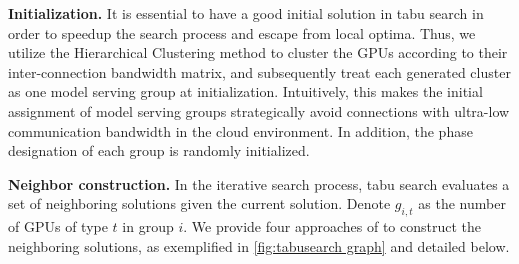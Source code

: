 \noindent \textbf{Initialization.} It is essential to have a good initial solution in tabu search in order to speedup the search process and escape from local optima. 
Thus, we utilize the Hierarchical Clustering method \cite{shetty2021hierarchical} to cluster the GPUs according to their inter-connection bandwidth matrix, and subsequently treat each generated cluster as one model serving group at initialization.
Intuitively, this makes the initial assignment of model serving groups strategically avoid connections with ultra-low communication bandwidth in the cloud environment. In addition, the phase designation of each group is randomly initialized.


\noindent \textbf{Neighbor construction.} 
In the iterative search process, tabu search evaluates a set of neighboring solutions given the current solution. Denote $g_{i,t}$ as the number of GPUs of type $t$ in group $i$. We provide four approaches of to construct the neighboring solutions, as exemplified in \autoref{fig:tabusearch graph} and detailed below.
% 
